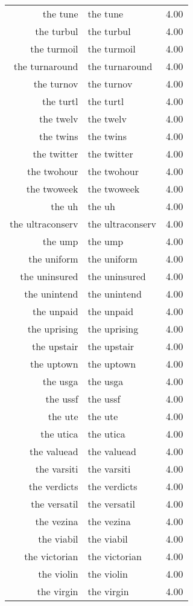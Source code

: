 \begin{table}[ht]
\begin{tabular}{rlr}
  the tune & the tune & 4.00 \\ 
  the turbul & the turbul & 4.00 \\ 
  the turmoil & the turmoil & 4.00 \\ 
  the turnaround & the turnaround & 4.00 \\ 
  the turnov & the turnov & 4.00 \\ 
  the turtl & the turtl & 4.00 \\ 
  the twelv & the twelv & 4.00 \\ 
  the twins & the twins & 4.00 \\ 
  the twitter & the twitter & 4.00 \\ 
  the twohour & the twohour & 4.00 \\ 
  the twoweek & the twoweek & 4.00 \\ 
  the uh & the uh & 4.00 \\ 
  the ultraconserv & the ultraconserv & 4.00 \\ 
  the ump & the ump & 4.00 \\ 
  the uniform & the uniform & 4.00 \\ 
  the uninsured & the uninsured & 4.00 \\ 
  the unintend & the unintend & 4.00 \\ 
  the unpaid & the unpaid & 4.00 \\ 
  the uprising & the uprising & 4.00 \\ 
  the upstair & the upstair & 4.00 \\ 
  the uptown & the uptown & 4.00 \\ 
  the usga & the usga & 4.00 \\ 
  the ussf & the ussf & 4.00 \\ 
  the ute & the ute & 4.00 \\ 
  the utica & the utica & 4.00 \\ 
  the valuead & the valuead & 4.00 \\ 
  the varsiti & the varsiti & 4.00 \\ 
  the verdicts & the verdicts & 4.00 \\ 
  the versatil & the versatil & 4.00 \\ 
  the vezina & the vezina & 4.00 \\ 
  the viabil & the viabil & 4.00 \\ 
  the victorian & the victorian & 4.00 \\ 
  the violin & the violin & 4.00 \\ 
  the virgin & the virgin & 4.00 \\ 

\end{tabular}
\end{table}
